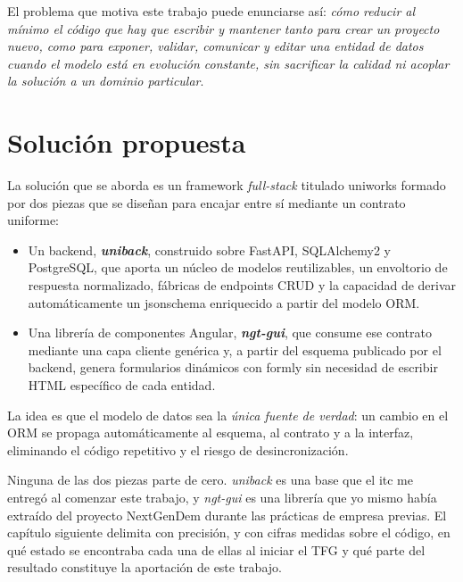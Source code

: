 El problema que motiva este trabajo puede enunciarse así: \emph{cómo reducir
al mínimo el código que hay que escribir y mantener tanto para crear un proyecto nuevo, como para exponer, validar,
comunicar y editar una entidad de datos cuando el modelo está en evolución
constante, sin sacrificar la calidad ni acoplar la solución a un dominio
particular}.

\section{Solución propuesta}
La solución que se aborda es un framework \emph{full-stack} titulado \gls{uniworks} formado por dos
piezas que se diseñan para encajar entre sí mediante un contrato uniforme:

\renewcommand{\labelitemi}{\textbullet}
\begin{itemize}
  \item Un backend, \textbf{\emph{uniback}}, construido sobre FastAPI,
  SQLAlchemy2 y PostgreSQL, que aporta un núcleo de modelos reutilizables,
  un envoltorio de respuesta normalizado, fábricas de endpoints CRUD y la
  capacidad de derivar automáticamente un \gls{jsonschema} enriquecido a
  partir del modelo ORM.
  \item Una librería de componentes Angular, \textbf{\emph{ngt-gui}}, que
  consume ese contrato mediante una capa cliente genérica y, a partir del
  esquema publicado por el backend, genera formularios dinámicos con
  \gls{formly} sin necesidad de escribir HTML específico de cada entidad.
\end{itemize}

La idea es que el modelo de datos sea la \emph{única fuente de
verdad}: un cambio en el ORM se propaga automáticamente al esquema, al
contrato y a la interfaz, eliminando el código repetitivo y el riesgo de
desincronización.

Ninguna de las dos piezas parte de cero. \emph{uniback} es una base que el
\gls{itc} me entregó al comenzar este trabajo, y \emph{ngt-gui} es una librería
que yo mismo había extraído del proyecto NextGenDem durante las prácticas de
empresa previas. El capítulo siguiente delimita con precisión, y con cifras
medidas sobre el código, en qué estado se encontraba cada una de ellas al
iniciar el TFG y qué parte del resultado constituye la aportación de este
trabajo.

